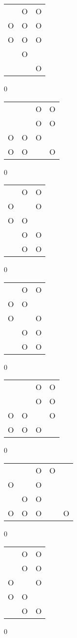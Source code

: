 \begin{tabular}{|m{0.2cm}m{0.2cm}m{0.2cm}|}\hline
 &O&O\\
O&O&O\\
O&O&O\\
 &O& \\
 & &O\\
\hline\end{tabular}0
\begin{tabular}{|m{0.2cm}m{0.2cm}m{0.2cm}m{0.2cm}|}\hline
 & &O&O\\
 & &O&O\\
O&O&O& \\
O&O& &O\\
\hline\end{tabular}0
\begin{tabular}{|m{0.2cm}m{0.2cm}m{0.2cm}|}\hline
 &O&O\\
O& &O\\
O&O& \\
 &O&O\\
 &O&O\\
\hline\end{tabular}0
\begin{tabular}{|m{0.2cm}m{0.2cm}m{0.2cm}|}\hline
 &O&O\\
O&O& \\
O& &O\\
 &O&O\\
 &O&O\\
\hline\end{tabular}0
\begin{tabular}{|m{0.2cm}m{0.2cm}m{0.2cm}m{0.2cm}|}\hline
 & &O&O\\
 & &O&O\\
O&O& &O\\
O&O&O& \\
\hline\end{tabular}0
\begin{tabular}{|m{0.2cm}m{0.2cm}m{0.2cm}m{0.2cm}m{0.2cm}|}\hline
 & &O&O& \\
O& &O& & \\
 &O&O& & \\
O&O&O& &O\\
\hline\end{tabular}0
\begin{tabular}{|m{0.2cm}m{0.2cm}m{0.2cm}|}\hline
 &O&O\\
 &O&O\\
O& &O\\
O&O& \\
 &O&O\\
\hline\end{tabular}0

